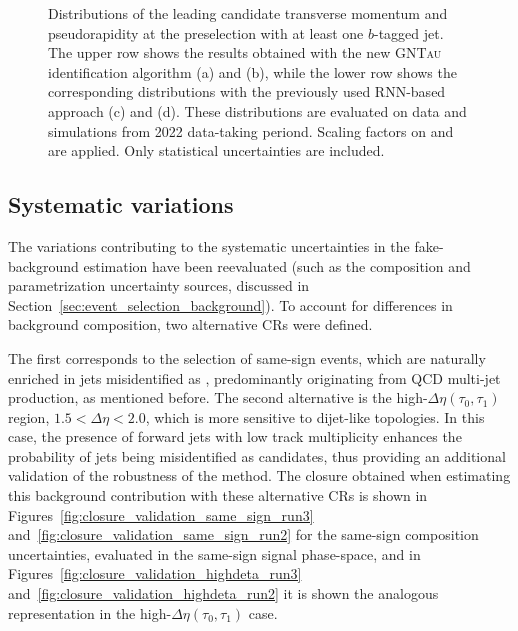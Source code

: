 \begin{figure}[htbp]
    \caption{Distributions of the leading \tauhad candidate transverse momentum and pseudorapidity at the \ttH preselection with at least one $b$-tagged jet. 
    The upper row shows the results obtained with the new \textsc{GNTau} identification algorithm (a) and (b), while the lower row shows the corresponding distributions with the previously used RNN-based approach (c) and (d). These distributions are evaluated on data and simulations from 2022 data-taking periond. Scaling factors on \ztautau and \ttbar are applied. Only statistical uncertainties are included.}
    \label{run2_fakes_comparison}
\end{figure}

\subsection{Systematic variations}

The variations contributing to the systematic uncertainties in the fake-\tauhad background estimation have been reevaluated (such as the composition and parametrization uncertainty sources,  discussed in Section~\ref{sec:event_selection_background}).
To account for differences in background composition, two alternative CRs were defined. 

The first corresponds to the selection of same-sign events, which are naturally enriched in jets misidentified as \tauhad, predominantly originating from QCD multi-jet production, as mentioned before.
The second alternative is the high-$\Delta\eta(\tau_0,\tau_1)$ region, $1.5 < \Delta\eta < 2.0$, which is more sensitive to dijet-like topologies. In this case, the presence of forward jets with low track multiplicity enhances the probability of jets being misidentified as \tauhad candidates, thus providing an additional validation of the robustness of the method. The closure obtained when estimating this background contribution with these alternative CRs is shown in Figures~\ref{fig:closure_validation_same_sign_run3} and~\ref{fig:closure_validation_same_sign_run2} for the same-sign composition uncertainties, evaluated in the same-sign \tauhadhad signal phase-space, and in Figures~\ref{fig:closure_validation_highdeta_run3} and~\ref{fig:closure_validation_highdeta_run2} it is shown the analogous representation in the high-$\Delta \eta (\tau_0,\tau_1)$ case.

